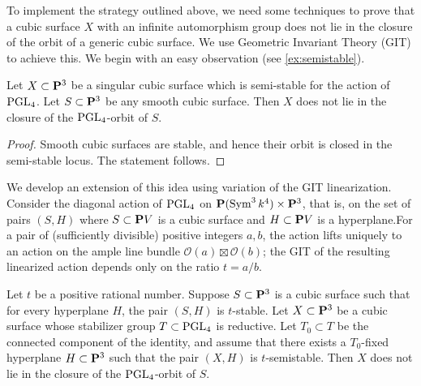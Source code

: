 \documentclass[12pt,reqno]{amsart}
\renewcommand{\k}{k}
\numberwithin{equation}{section}
\begin{document}
To implement the strategy outlined above, we need some techniques to prove that a cubic surface $X$ with an infinite automorphism group does not lie in the closure of the orbit of a generic cubic surface.
We use Geometric Invariant Theory (GIT) to achieve this.
We begin with an easy observation (see \autoref{ex:semistable}).
\begin{proposition}
  Let $X \subset \P^3$ be a singular cubic surface which is semi-stable for the action of $\PGL_4$.
  Let $S \subset \P^3$ be any smooth cubic surface.
  Then $X$ does not lie in the closure of the $\PGL_4$-orbit of $S$.
\end{proposition}
\begin{proof}
  Smooth cubic surfaces are stable, and hence their orbit is closed in the semi-stable locus.  The statement follows.
\end{proof}

We develop an extension of this idea using variation of the GIT linearization.
Consider the diagonal action
of $\PGL_4$ on $\P(\Sym^3 \k^4) \times \P^3$, that is, on the set of pairs $(S, H)$ where $S \subset \P V$ is a cubic surface and $H \subset \P V$ is a hyperplane.For a pair of (sufficiently divisible) positive integers $a, b$, the action lifts uniquely to an action on the ample
line bundle $\mathcal O(a)\boxtimes \mathcal O(b)$; the GIT of the
resulting linearized action depends only on the ratio $t = a/b$.

\begin{proposition}\label{prop:nolimit}
  Let $t$ be a positive rational number.
  Suppose $S \subset \P^3$ is a cubic surface such that for every hyperplane $H$, the pair $(S,H)$ is $t$-stable.
  Let $X \subset \P^3$ be a cubic surface whose stabilizer group $T \subset \PGL_4$ is reductive.
  Let $T_0 \subset T$ be the connected component of the identity, and assume that there exists a $T_0$-fixed hyperplane $H \subset \P^3$ such that the pair $(X, H)$ is $t$-semistable.
  Then $X$ does not lie in the closure of the $\PGL_4$-orbit of $S$.
\end{proposition}
\end{document}
